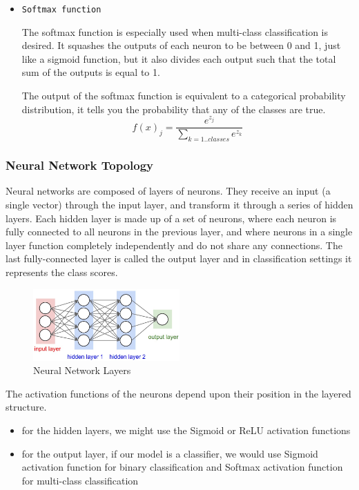 \documentclass[a4paper,10pt]{article}
\begin{document}
\begin{itemize}
 	
 	
 	\vspace{5mm} %
 	\item \texttt{Softmax function}
 	
 	\quad The softmax function is especially used when multi-class classification is desired. It squashes the outputs of each neuron to be between 0 and 1, just like a sigmoid function, but it also divides each output such that the total sum of the outputs is equal to 1.
 	
 	\quad The output of the softmax function is equivalent to a categorical probability distribution, it tells you the probability that any of the classes are true.
	$$ f(x)_j = \frac{e^{z_{j}}}{\sum_{k=1..classes } e^{z_{k}}} $$
	\end{itemize}

\subsubsection{Neural Network Topology}

\quad Neural networks are composed of layers of neurons. 
They receive an input (a single vector) through the input layer, and transform it through a series of hidden layers. Each hidden layer is made up of a set of neurons, where each neuron is fully connected to all neurons in the previous layer, and where neurons in a single layer function completely independently and do not share any connections. The last fully-connected layer is called the output layer and in classification settings it represents the class scores.


\begin{figure}[!htbp]
	\centering
	\includegraphics[width=0.5\textwidth]{layers.jpg}
	\caption{Neural Network Layers}
\end{figure}

\quad The activation functions of the neurons depend upon their position in the layered structure.
\begin{itemize}
	\item for the hidden layers, we might use the Sigmoid or ReLU activation functions
	\item for the output layer, if our model is a classifier, we would use Sigmoid activation function for binary classification and Softmax activation function for multi-class classification  
\end{itemize}
\end{document}
